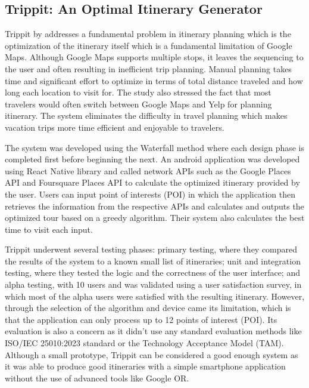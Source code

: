 \subsection{Trippit: An Optimal Itinerary Generator}

Trippit by \textcite{Nguyen2019} addresses a fundamental problem in itinerary planning which is the optimization of the itinerary itself which is a fundamental limitation of Google Maps. Although Google Maps supports multiple stops, it leaves the sequencing to the user and often resulting in inefficient trip planning. Manual planning takes time and significant effort to optimize in terms of total distance traveled and how long each location to visit for. The study also stressed the fact that most travelers would often switch between Google Maps and Yelp for planning itinerary. The system eliminates the difficulty in travel planning which makes vacation trips more time efficient and enjoyable to travelers.

The system was developed using the Waterfall method where each design phase is completed first before beginning the next. An android application was developed using React Native library and called network APIs such as the Google Places API and Foursquare Places API to calculate the optimized itinerary provided by the user. Users can input point of interests (POI) in which the application then retrieves the information from the respective APIs and calculates and outputs the optimized tour based on a greedy algorithm. Their system also calculates the best time to visit each input.

Trippit underwent several testing phases: primary testing, where they compared the results of the system to a known small list of itineraries; unit and integration testing, where they tested the logic and the correctness of the user interface; and alpha testing, with 10 users and was validated using a user satisfaction survey, in which most of the alpha users were satisfied with the resulting itinerary.  However, through the selection of the algorithm  and device came its limitation, which is that the application can only process up to 12 points of interest (POI). Its evaluation is also a concern as it didn’t use any standard evaluation methods like ISO/IEC 25010:2023 standard or the Technology Acceptance Model (TAM). Although a small prototype, Trippit can be considered a good enough system as it was able to produce good itineraries with a simple smartphone application without the use of advanced tools like Google OR.

